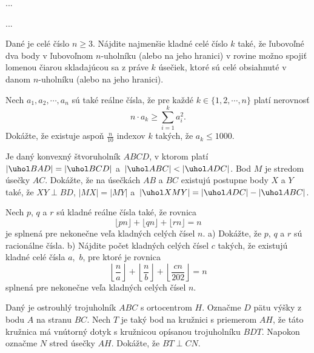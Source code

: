 {%
...}

{%
...}

{%
Dané je celé číslo $n \geq 3$. Nájdite najmenšie kladné celé číslo $k$ také, že ľubovoľné dva body v ľubovoľnom $n$-uholníku (alebo na jeho hranici) v rovine možno spojiť lomenou čiarou skladajúcou sa z práve $k$ úsečiek, ktoré sú celé obsiahnuté v danom $n$-uholníku (alebo na jeho hranici).}

{%
Nech $a_1, a_2, \cdots, a_n$ sú také reálne čísla, že pre každé $k \in \{1, 2, \cdots, n\}$ platí nerovnosť
$$
n\cdot a_k\geq \sum_{i=1}^k a_i^2.
$$
Dokážte, že existuje aspoň $\frac{n}{10}$ indexov $k$ takých, že $a_k\leq 1000$.}

{%
Je daný konvexný štvoruholník $ABCD$, v ktorom platí $|\uhol BAD| = |\uhol BCD|$ a~$|\uhol ABC| < |\uhol ADC|$. Bod $M$ je stredom úsečky $AC$. Dokážte, že na úsečkách $AB$ a $BC$ existujú postupne body $X$ a $Y$ také, že $XY \perp BD$, $|MX| = |MY|$ a~$|\uhol XMY| = |\uhol ADC| - |\uhol ABC|$.}

{%
Nech $p$, $q$ a $r$ sú kladné reálne čísla také, že rovnica
$$
\lfloor pn\rfloor + \lfloor qn\rfloor + \lfloor rn\rfloor =n
$$
je splnená pre nekonečne veľa kladných celých čísel $n$.
\ite a) Dokážte, že $p$, $q$ a $r$ sú racionálne čísla.
\ite b) Nájdite počet kladných celých čísel $c$ takých, že existujú kladné celé čísla $a$,~$b$, pre ktoré je rovnica
     $$
     \left\lfloor \frac{n}{a}\right\rfloor+\left\lfloor \frac{n}{b}\right\rfloor +\left\lfloor\frac{cn}{202}\right\rfloor =n
     $$
     splnená pre nekonečne veľa kladných celých čísel $n$.\endgraf
}

{%
Daný je ostrouhlý trojuholník $ABC$ s ortocentrom $H$. Označme $D$ pätu výšky z bodu $A$ na stranu $BC$. Nech $T$ je taký bod na kružnici s priemerom $AH$, že táto kružnica má vnútorný dotyk s kružnicou opísanou trojuholníku $BDT$. Napokon označme $N$ stred úsečky $AH$. Dokážte, že $BT \perp CN$. }

